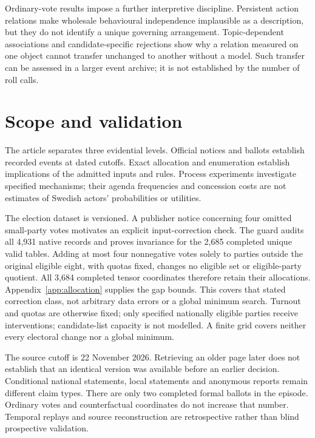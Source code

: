 \documentclass[11pt,a4paper]{article}
\begin{document}
Ordinary-vote results impose a further interpretive discipline. Persistent action relations make wholesale behavioural independence implausible as a description, but they do not identify a unique governing arrangement. Topic-dependent associations and candidate-specific rejections show why a relation measured on one object cannot transfer unchanged to another without a model. Such transfer can be assessed in a larger event archive; it is not established by the number of roll calls.

\section{Scope and validation}

The article separates three evidential levels. Official notices and ballots establish recorded events at dated cutoffs. Exact allocation and enumeration establish implications of the admitted inputs and rules. Process experiments investigate specified mechanisms; their agenda frequencies and concession costs are not estimates of Swedish actors' probabilities or utilities.

The election dataset is versioned. A publisher notice concerning four omitted small-party votes motivates an explicit input-correction check. The guard audits all 4,931 native records and proves invariance for the 2,685 completed unique valid tables. Adding at most four nonnegative votes solely to parties outside the original eligible eight, with quotas fixed, changes no eligible set or eligible-party quotient. All 3,684 completed tensor coordinates therefore retain their allocations. Appendix~\ref{app:allocation} supplies the gap bounds. This covers that stated correction class, not arbitrary data errors or a global minimum search. Turnout and quotas are otherwise fixed; only specified nationally eligible parties receive interventions; candidate-list capacity is not modelled. A finite grid covers neither every electoral change nor a global minimum.

The source cutoff is 22 November 2026. Retrieving an older page later does not establish that an identical version was available before an earlier decision. Conditional national statements, local statements and anonymous reports remain different claim types. There are only two completed formal ballots in the episode. Ordinary votes and counterfactual coordinates do not increase that number. Temporal replays and source reconstruction are retrospective rather than blind prospective validation.
\end{document}
